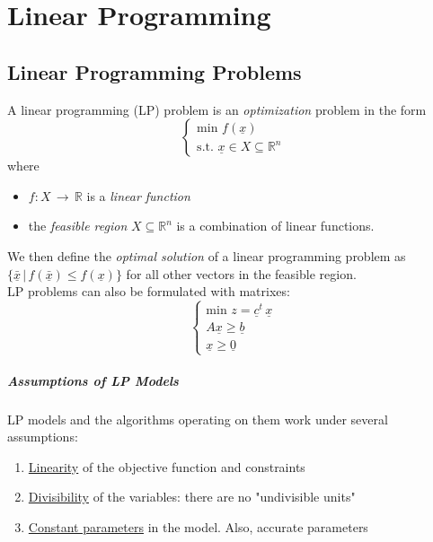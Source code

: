 \chapter{Linear Programming}
    \section{Linear Programming Problems}
        A linear programming (LP) problem is an \textit{optimization} problem in the form
        \begin{equation}
            \begin{cases}
                \text{min } f(\underline{x})\\
                \text{s.t. } \underline{x} \in X \subseteq \mathbb{R}^n
            \end{cases}
        \end{equation}
        where
        \begin{itemize}
            \item $f: X \,\rightarrow\, \mathbb{R}$ is a \textit{linear function}
            \item the \textit{feasible region} $X \subseteq \mathbb{R}^n$ is a combination of linear functions.
        \end{itemize}
        We then define the \textit{optimal solution} of a linear programming problem as $\{\underline{\bar{x}}\, \vert\, f(\underline{\bar{x}}) \leq f(\underline{x})\}$ for all other vectors in the feasible region.\\
        LP problems can also be formulated with matrixes:
        \begin{equation}
            \begin{cases}
                \text{min } z = \underline{c}^t\, \underline{x}\\
                A\underline{x} \geq \underline{b}\\
                \underline{x} \geq \underline{0}
            \end{cases}
        \end{equation}

        \paragraph{Assumptions of LP Models}
            LP models and the algorithms operating on them work under several assumptions:
            \begin{enumerate}
                \item \underline{Linearity} of the objective function and constraints
                \item \underline{Divisibility} of the variables: there are no "undivisible units"
                \item \underline{Constant parameters} in the model. Also, accurate parameters
            \end{enumerate}

